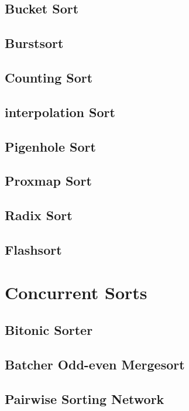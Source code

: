 			\subsection{Bucket Sort}

			\subsection{Burstsort}

			\subsection{Counting Sort}

			\subsection{interpolation Sort}

			\subsection{Pigenhole Sort}

			\subsection{Proxmap Sort}

			\subsection{Radix Sort}

			\subsection{Flashsort}

		\section{Concurrent Sorts}
			\subsection{Bitonic Sorter}

			\subsection{Batcher Odd-even Mergesort}

			\subsection{Pairwise Sorting Network}

